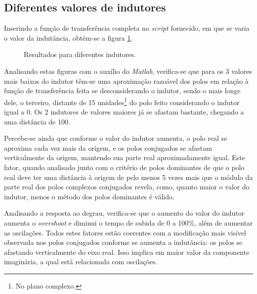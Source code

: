 \documentclass{article}[twocolumn]
\begin{document}
	\subsection{Diferentes valores de indutores}
	Inserindo a fun\c{c}\~ao de transfer\^encia completa no \textit{script} fornecido,
	em que se varia o valor da indut\^ancia, obt\'em-se a figura \ref{fig:inductors}.
	\begin{figure}[H]
		\centering
		\caption{Resultados para diferentes indutores.}
		\label{fig:inductors}
	\end{figure}
	Analisando estas figuras com o aux\'ilio do \textit{Matlab}, verifica-se que para os
	3 valores mais baixos do indutor t\^em-se uma aproxima\c{c}\~ao razo\'avel dos polos
	em rela\c{c}\~ao \`a fun\c{c}\~ao de transfer\^encia feita se desconsiderando o indutor,
	sendo o mais longe dele, o terceiro, distante de 15 unidades\footnote{No plano complexo.}
	do polo feito considerando o indutor igual a 0. Os 2 indutores de valores maiores j\'a se
	afastam bastante, chegando a uma dist\^ancia de 100.

	Percebe-se ainda que conforme o valor do indutor aumenta, o polo real se aproxima cada vez
	mais da origem, e os polos conjugados se afastam verticalmente da origem, mantendo sua
	parte real aproximadamente igual. Este fator, quando analisado junto com o crit\'erio
	de polos dominantes de que o polo real deve ter uma dist\^ancia \`a origem de pelo menos
	5 vezes mais que o m\'odulo da parte real dos polos complexos conjugados revela, como,
	quanto maior o valor do indutor, menos o m\'etodo dos polos dominantes \'e v\'alido.

	Analisando a resposta ao degrau, verifica-se que o aumento do valor do indutor
	aumenta o \textit{overshoot} e diminui o tempo de subida de 0 a 100\%, al\'em de aumentar
	as oscila\c{c}\~oes. Todos estes fatores est\~ao coerentes com a modifica\c{c}\~ao
	mais vis\'ivel observada nos polos conjugados conforme se aumenta a indut\^ancia:
	os polos se afastando verticalmente do eixo real. Isso implica em maior valor
	da componente imagin\'aria, a qual est\'a relacionada com oscila\c{c}\~oes.
\end{document}
